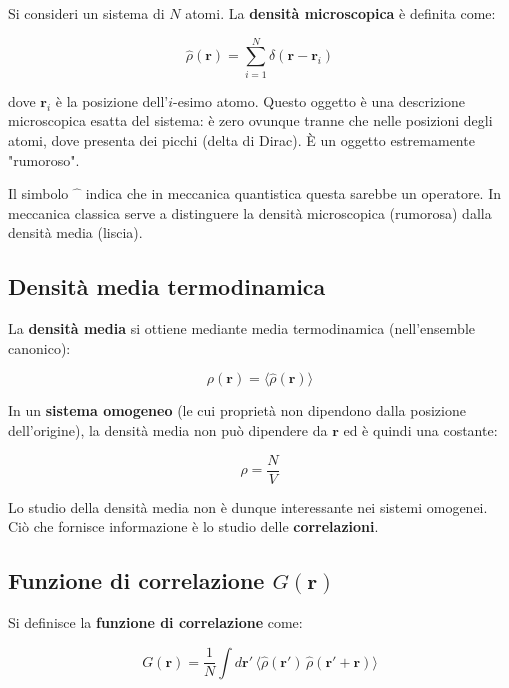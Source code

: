 Si consideri un sistema di $N$ atomi. La \textbf{densità microscopica} è definita come:

\begin{equation}
\hat{\rho}(\mathbf{r}) = \sum_{i=1}^{N} \delta(\mathbf{r} - \mathbf{r}_i)
\end{equation}

dove $\mathbf{r}_i$ è la posizione dell'$i$-esimo atomo. Questo oggetto è una descrizione microscopica esatta del sistema: è zero ovunque tranne che nelle posizioni degli atomi, dove presenta dei picchi (delta di Dirac). È un oggetto estremamente "rumoroso".

\begin{nota}
Il simbolo $\hat{\phantom{x}}$ indica che in meccanica quantistica questa sarebbe un operatore. In meccanica classica serve a distinguere la densità microscopica (rumorosa) dalla densità media (liscia).
\end{nota}

\subsection*{Densità media termodinamica}

La \textbf{densità media} si ottiene mediante media termodinamica (nell'ensemble canonico):

\begin{equation}
\rho(\mathbf{r}) = \langle \hat{\rho}(\mathbf{r}) \rangle
\end{equation}

In un \textbf{sistema omogeneo} (le cui proprietà non dipendono dalla posizione dell'origine), la densità media non può dipendere da $\mathbf{r}$ ed è quindi una costante:

$$\rho = \frac{N}{V}$$

Lo studio della densità media non è dunque interessante nei sistemi omogenei. Ciò che fornisce informazione è lo studio delle \textbf{correlazioni}.

\subsection*{Funzione di correlazione $G(\mathbf{r})$}

Si definisce la \textbf{funzione di correlazione} come:

\begin{equation}
G(\mathbf{r}) = \frac{1}{N} \int d\mathbf{r}' \, \langle \hat{\rho}(\mathbf{r}') \, \hat{\rho}(\mathbf{r}' + \mathbf{r}) \rangle
\end{equation}

